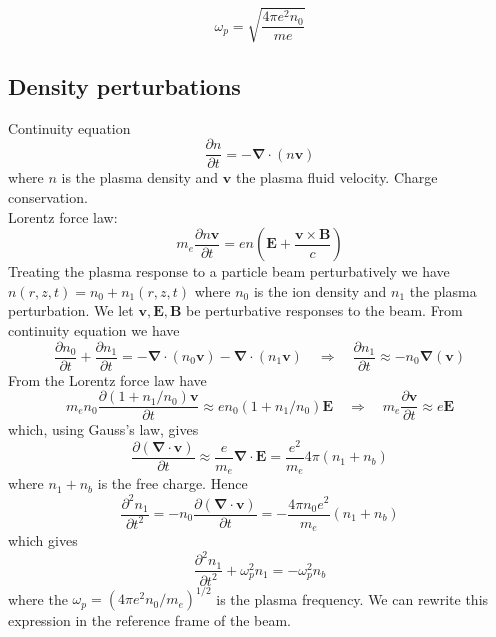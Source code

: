 \documentclass[%
onecolumn, notitlepage,
 amsmath,amssymb,
 aps,
]{article}
\renewcommand{\vec}[1]{\mathbf{#1}}
\renewcommand{\vec}[1]{\mathbf{#1}}
\begin{document}
\begin{equation}
\omega_p=\sqrt{\frac{4\pi e^2n_0}{me}}
\end{equation}
\subsection*{Density perturbations}
Continuity equation
\begin{equation}
\frac{\partial n}{\partial t}=-\mathbf{\nabla}\cdot (n\vec{v})
\end{equation}
where $n$ is the plasma density and $\vec{v}$ the plasma fluid velocity. Charge conservation.\\
Lorentz force law:
\begin{equation}
m_e\frac{\partial n\vec{v}}{\partial t}=en\left(\vec{E}+\frac{\vec{v}\times \vec{B}}{c}\right)
\end{equation}
Treating the plasma response to a particle beam perturbatively we have $n(r,z,t)=n_0+n_1(r,z,t)$ where $n_0$ is the ion density and $n_1$ the plasma perturbation. We let $\vec{v}, \vec{E}, \vec{B}$ be perturbative responses to the beam. From continuity equation we have
\begin{equation}
\frac{\partial n_0}{\partial t}+\frac{\partial n_1}{\partial t}=-\mathbf{\nabla}\cdot (n_0\vec{v})-\mathbf{\nabla}\cdot (n_1\vec{v}) \quad \Rightarrow \quad \frac{\partial n_1}{\partial t}\approx -n_0\mathbf{\nabla}(\vec{v})
\end{equation}
From the Lorentz force law have
\begin{equation}
m_en_0\frac{\partial (1+n_1/n_0)\vec{v}}{\partial t}\approx en_0(1+n_1/n_0)\vec{E} \quad \Rightarrow \quad  m_e\frac{\partial \vec{v}}{\partial t}\approx e\vec{E}
\end{equation}
which, using Gauss's law, gives
\begin{equation}
\frac{\partial (\mathbf{\nabla}\cdot\vec{v})}{\partial t}\approx \frac{e}{m_e}\mathbf{\nabla}\cdot\vec{E}= \frac{e^2}{m_e}4\pi (n_1+n_b)
\end{equation}
where $n_1+n_b$ is the free charge. Hence
\begin{equation}
\frac{\partial^2 n_1}{\partial t^2}= -n_0\frac{\partial (\mathbf{\nabla}\cdot\vec{v})}{\partial t}=-\frac{ 4\pi n_0e^2}{m_e} (n_1+n_b) 
\end{equation}
which gives
\begin{equation}
\frac{\partial^2 n_1}{\partial t^2}+\omega_p^2n_1=-\omega_p^2n_b
\end{equation}
where the $\omega_p=(4\pi e^2n_0/m_e)^{1/2}$ is the plasma frequency. We can rewrite this expression in the reference frame of the beam.\\
\end{document}
